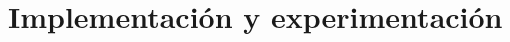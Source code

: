 \cleardoublepage
\clearpage{}

\chapter[Implementación y experimentación]{Implementación y experimentación}
